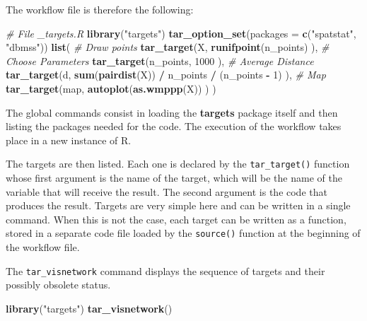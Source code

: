 \documentclass[
  12pt,
  american,
  a4paper,
  extrafontsizes,onecolumn,openright
  ]{memoir}
\newenvironment{Shaded}{\begin{snugshade}}{\end{snugshade}}
\newcommand{\AttributeTok}[1]{\textcolor[rgb]{0.13,0.29,0.53}{#1}}
\newcommand{\CommentTok}[1]{\textcolor[rgb]{0.56,0.35,0.01}{\textit{#1}}}
\newcommand{\DecValTok}[1]{\textcolor[rgb]{0.00,0.00,0.81}{#1}}
\newcommand{\FunctionTok}[1]{\textcolor[rgb]{0.13,0.29,0.53}{\textbf{#1}}}
\newcommand{\NormalTok}[1]{#1}
\newcommand{\SpecialCharTok}[1]{\textcolor[rgb]{0.81,0.36,0.00}{\textbf{#1}}}
\newcommand{\StringTok}[1]{\textcolor[rgb]{0.31,0.60,0.02}{#1}}
\begin{document}
The workflow file is therefore the following:

\scriptsize

\begin{Shaded}
\begin{Highlighting}[]
\CommentTok{\# File \_targets.R }
\FunctionTok{library}\NormalTok{(}\StringTok{"targets"}\NormalTok{)}
\FunctionTok{tar\_option\_set}\NormalTok{(}\AttributeTok{packages =} \FunctionTok{c}\NormalTok{(}\StringTok{"spatstat"}\NormalTok{, }\StringTok{"dbmss"}\NormalTok{))}
\FunctionTok{list}\NormalTok{(}
  \CommentTok{\# Draw points}
  \FunctionTok{tar\_target}\NormalTok{(X,}
    \FunctionTok{runifpoint}\NormalTok{(n\_points)}
\NormalTok{  ),}
  \CommentTok{\# Choose Parameters}
  \FunctionTok{tar\_target}\NormalTok{(n\_points,}
    \DecValTok{1000}
\NormalTok{  ),}
  \CommentTok{\# Average Distance}
  \FunctionTok{tar\_target}\NormalTok{(d,}
    \FunctionTok{sum}\NormalTok{(}\FunctionTok{pairdist}\NormalTok{(X)) }\SpecialCharTok{/}\NormalTok{ n\_points }\SpecialCharTok{/}\NormalTok{ (n\_points }\SpecialCharTok{{-}} \DecValTok{1}\NormalTok{)}
\NormalTok{  ),}
  \CommentTok{\# Map}
  \FunctionTok{tar\_target}\NormalTok{(map, }
    \FunctionTok{autoplot}\NormalTok{(}\FunctionTok{as.wmppp}\NormalTok{(X))}
\NormalTok{  )}
\NormalTok{)}
\end{Highlighting}
\end{Shaded}

\normalsize

The global commands consist in loading the \textbf{targets} package itself and then listing the packages needed for the code.
The execution of the workflow takes place in a new instance of R.

The targets are then listed.
Each one is declared by the \texttt{tar\_target()} function whose first argument is the name of the target, which will be the name of the variable that will receive the result.
The second argument is the code that produces the result.
Targets are very simple here and can be written in a single command.
When this is not the case, each target can be written as a function, stored in a separate code file loaded by the \texttt{source()} function at the beginning of the workflow file.

The \texttt{tar\_visnetwork} command displays the sequence of targets and their possibly obsolete status.

\scriptsize

\begin{Shaded}
\begin{Highlighting}[]
\FunctionTok{library}\NormalTok{(}\StringTok{"targets"}\NormalTok{)}
\FunctionTok{tar\_visnetwork}\NormalTok{()}
\end{Highlighting}
\end{Shaded}
\end{document}
